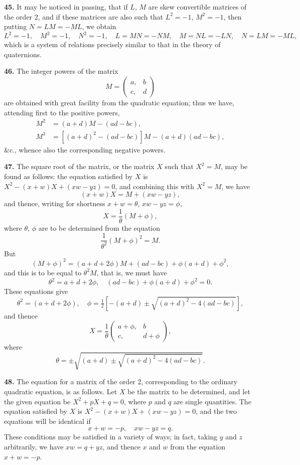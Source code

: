 \documentclass[12pt,a4paper]{article}
\theoremstyle{definition}
\begin{document}
\medskip
\noindent\textbf{45.} It may be noticed in passing, that if $L$, $M$ are skew convertible matrices of the order 2, and if these matrices are also such that $L^2=-1$, $M^2=-1$, then putting $N=LM=-ML$, we obtain
\[
L^2=-1,\quad M^2=-1,\quad N^2=-1,\quad L=MN=-NM,\quad M=NL=-LN,\quad N=LM=-ML,
\]
which is a system of relations precisely similar to that in the theory of quaternions.

\medskip
\noindent\textbf{46.} The integer powers of the matrix
\[
M = \begin{pmatrix} a, & b \\ c, & d \end{pmatrix}
\]
are obtained with great facility from the quadratic equation; thus we have, attending first to the positive powers,
\begin{align*}
M^2 &= (a+d)M - (ad-bc), \\
M^3 &= [(a+d)^2-(ad-bc)]M - (a+d)(ad-bc),
\end{align*}
\&c., whence also the corresponding negative powers.

\medskip
\noindent\textbf{47.} The square root of the matrix, or the matrix $X$ such that $X^2=M$, may be found as follows: the equation satisfied by $X$ is $X^2-(x+w)X+(xw-yz)=0$, and combining this with $X^2=M$, we have
\[(x+w)X = M + (xw-yz),\]
and thence, writing for shortness $x+w=\theta$, $xw-yz=\phi$,
\[X = \frac{1}{\theta}(M+\phi),\]
where $\theta$, $\phi$ are to be determined from the equation
\[\frac{1}{\theta^2}(M+\phi)^2 = M.\]
But
\[(M+\phi)^2 = (a+d+2\phi)M + (ad-bc) + \phi(a+d) + \phi^2,\]
and this is to be equal to $\theta^2 M$, that is, we must have
\[
\theta^2 = a+d+2\phi,\quad (ad-bc)+\phi(a+d)+\phi^2=0.
\]
These equations give
\[
\theta^2 = (a+d+2\phi),\quad \phi = \tfrac{1}{2}[-(a+d) \pm \sqrt{(a+d)^2 - 4(ad-bc)}],
\]
and thence
\[
X = \frac{1}{\theta}\begin{pmatrix} a+\phi, & b \\ c, & d+\phi \end{pmatrix},
\]
where
\[
\theta = \pm\sqrt{(a+d) \pm \sqrt{(a+d)^2 - 4(ad-bc)}}.
\]

\medskip
\noindent\textbf{48.} The equation for a matrix of the order 2, corresponding to the ordinary quadratic equation, is as follows. Let $X$ be the matrix to be determined, and let the given equation be $X^2 + pX + q = 0$, where $p$ and $q$ are single quantities. The equation satisfied by $X$ is $X^2 - (x+w)X + (xw-yz) = 0$, and the two equations will be identical if
\[x+w = -p,\quad xw-yz = q.\]
These conditions may be satisfied in a variety of ways; in fact, taking $y$ and $z$ arbitrarily, we have $xw = q+yz$, and thence $x$ and $w$ from the equation $x+w=-p$.
\end{document}
